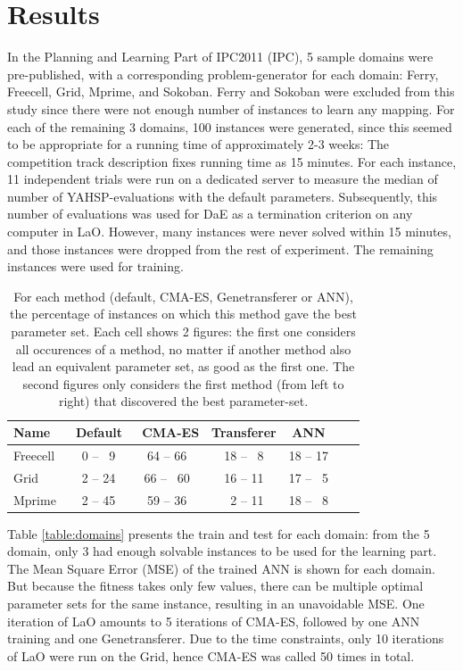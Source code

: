 \documentclass{MYsig-alternate}
\begin{document}
\section{Results}
\label{section:results}

In the Planning and Learning Part of IPC2011 (IPC), 5 sample domains were pre-published, with a corresponding problem-generator for each domain: Ferry, Freecell, Grid, Mprime, and Sokoban. Ferry and Sokoban were excluded from this study since there were not enough number of instances to learn any mapping. For each of the remaining 3 domains, 100 instances were generated, since this seemed to be appropriate for a running time of approximately 2-3 weeks: The competition track description fixes running time as 15 minutes. For each instance, 11 independent trials were run on a dedicated server to measure the median of number of YAHSP-evaluations with the default parameters. Subsequently, this number of evaluations was used for DaE as a termination criterion on any computer in LaO. However, many instances were never solved within 15 minutes, and those instances were dropped from the rest of experiment. The remaining instances were used for training.


 \begin{table}[tb!]
\centering
\begin{tabular}{l c c c c c c}
\hline\hline
Name & \ Default & \ CMA-ES &  Transferer & ANN \\ 
\hline
Freecell & ~0 -- ~9& 64 -- 66  & 18 -- ~8  & 18 -- 17     \\
Grid & ~2 -- 24 & 66 -- ~60  & 16 -- 11 & 17 -- ~5  &    \\
Mprime &  ~2 -- 45& 59 -- 36 & ~2 -- 11  & 18 -- ~8  &    \\
\hline
\end{tabular}
\caption{For each method (default, CMA-ES, Genetransferer or ANN), the percentage of instances on which this method gave the best parameter set. Each cell shows 2 figures: the first one considers all occurences of a method, no matter if another method also lead an equivalent parameter set, as good as the first one. The second figures only considers the first method (from left to right) that discovered the best parameter-set.}
\label{table:hints}
\end{table} 


Table \ref{table:domains} presents the train and test for each domain: from the 5 domain, only 3 had enough solvable instances to be used for the learning part. The Mean Square Error (MSE) of the trained ANN is shown for each domain. But because the fitness takes only few values, there can be multiple optimal parameter sets for the same instance, resulting in an unavoidable MSE. 
One iteration of LaO amounts to 5 iterations of CMA-ES, followed by one ANN training and one Genetransferer. Due to the time constraints, only 10 iterations of LaO were run on the Grid, hence CMA-ES was called 50 times in total.
\end{document}
